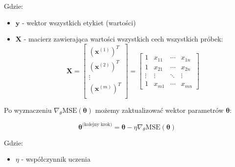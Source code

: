 \documentclass{article}
\begin{document}
\noindent Gdzie:
\begin{itemize}
    \item $\bm{y}$ - wektor wszystkich etykiet (wartości)
    \item $\bm{X}$ - macierz zawierająca wartości wszystkich cech wszystkich próbek:
    $$\bm{X}=\begin{bmatrix}
        (\bm{x}^{(1)})^T \\
        (\bm{x}^{(2)})^T \\
        \vdots \\
        (\bm{x}^{(m)})^T \\
    \end{bmatrix} = \begin{bmatrix}
        1 & x_{11} & \cdots & x_{1n} \\
        1 & x_{21} & \cdots & x_{2n} \\
        \vdots & \vdots & \ddots &  \vdots \\
        1 & x_{m1} & \cdots & x_{mn}
    \end{bmatrix}$$
\end{itemize}

\noindent Po wyznaczeniu $\nabla_{\theta}\text{MSE}(\bm{\theta})$ możemy zaktualizować wektor parametrów $\bm{\theta}$:

\begin{equation}
    \bm{\theta}^{\text{(kolejny krok)}} = \bm{\theta} - \eta\nabla_{\theta}\text{MSE}(\bm{\theta})
\end{equation}

\noindent Gdzie:

\begin{itemize}
    \item $\eta$ - współczynnik uczenia
\end{itemize}
\end{document}
